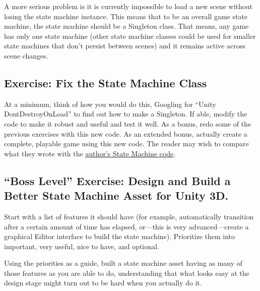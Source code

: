 A more serious problem is it is currently impossible to load a new scene
without losing the state machine instance. This means that to be an
overall game state machine, the state machine should be a Singleton
class. That means, any game has only one state machine (other state
machine classes could be used for smaller state machines that don't
persist between scenes) and it remains active across scene changes.

\subsection[Exercise: Fix the State Machine
Class]{\texorpdfstring{\protect\hypertarget{anchor-14}{}{}Exercise: Fix
the State Machine
Class}{Exercise: Fix the State Machine Class}}\label{exercise-fix-the-state-machine-class}

At a minimum, think of how you would do this, Googling for ``Unity
DontDestroyOnLoad'' to find out how to make a Singleton. If able, modify
the code to make it robust and useful and test it well. As a bonus, redo
some of the previous exercises with this new code. As an extended bonus,
actually create a complete, playable game using this new code. The
reader may wish to compare what they wrote with the
\href{https://github.com/tdvance/GameStateMachine}{author's State
Machine code}.

\subsection[``Boss Level'' Exercise: Design and Build a Better State
Machine Asset for Unity
3D.]{\texorpdfstring{\protect\hypertarget{anchor-15}{}{}``Boss Level''
Exercise: Design and Build a Better State Machine Asset for Unity
3D.}{Boss Level Exercise: Design and Build a Better State Machine Asset for Unity 3D.}}\label{boss-level-exercise-design-and-build-a-better-state-machine-asset-for-unity-3d.}

Start with a list of features it should have (for example, automatically
transition after a certain amount of time has elapsed, or---this is very
advanced---create a graphical Editor interface to build the state
machine). Prioritize them into important, very useful, nice to have, and
optional.

Using the priorities as a guide, built a state machine asset having as
many of those features as you are able to do, understanding that what
looks easy at the design stage might turn out to be hard when you
actually do it.

